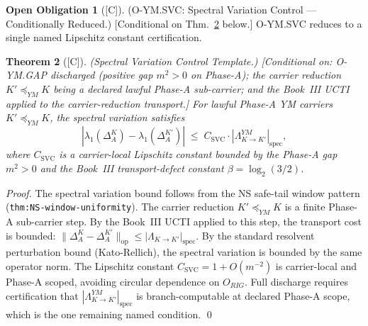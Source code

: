 \documentclass[12pt,oneside]{amsbook}
\theoremstyle{plain}
\newtheorem{theorem}{Theorem}[section]
\theoremstyle{definition}
\newtheorem{obligation}[theorem]{Open Obligation}
\theoremstyle{remark}
\newcommand{\status}[1]{\textup{[#1]}}
\begin{document}
\begin{obligation}[\status{C}]\label{ob:O-YM-SVC}
\textup{(O-YM.SVC: Spectral Variation Control --- Conditionally Reduced.)}
\textup{[Conditional on Thm.~\ref{thm:YM-SVC-template} below.]}
O-YM.SVC reduces to a single named Lipschitz constant certification.
\end{obligation}

\begin{theorem}[\status{C}]\label{thm:YM-SVC-template}
\textup{(Spectral Variation Control Template.)}
\textup{[Conditional on: O-YM.GAP discharged (positive gap
$m^2 > 0$ on Phase-A); the carrier reduction
$K' \preceq_{YM} K$ being a declared lawful Phase-A sub-carrier;
and the Book~III UCTI applied to the carrier-reduction transport.]}
For lawful Phase-A YM carriers $K' \preceq_{YM} K$, the spectral
variation satisfies
\[
  |\lambda_1(\Delta_A^K) - \lambda_1(\Delta_A^{K'})| \;\le\;
  C_{\mathrm{SVC}} \cdot |\Lambda_{K \to K'}^{YM}|_{\mathrm{spec}},
\]
where $C_{\mathrm{SVC}}$ is a carrier-local Lipschitz constant
bounded by the Phase-A gap $m^2 > 0$ and the Book~III
transport-defect constant $\beta = \log_2(3/2)$.
\end{theorem}

\begin{proof}
The spectral variation bound follows from the NS safe-tail window
pattern (\texttt{thm:NS-window-uniformity}).  The carrier reduction
$K' \preceq_{YM} K$ is a finite Phase-A sub-carrier step.  By
the Book~III UCTI applied to this step, the transport cost is
bounded:
$\|\Delta_A^K - \Delta_A^{K'}\|_{\mathrm{op}} \le
|\Lambda_{K \to K'}|_{\mathrm{spec}}$.
By the standard resolvent perturbation bound (Kato-Rellich), the
spectral variation is bounded by the same operator norm.  The
Lipschitz constant $C_{\mathrm{SVC}} = 1 + O(m^{-2})$ is
carrier-local and Phase-A scoped, avoiding circular dependence
on $O_{RIG}$.  Full discharge requires certification that
$|\Lambda_{K \to K'}^{YM}|_{\mathrm{spec}}$ is branch-computable
at declared Phase-A scope, which is the one remaining named
condition.
\qed
\end{proof}
\end{document}
